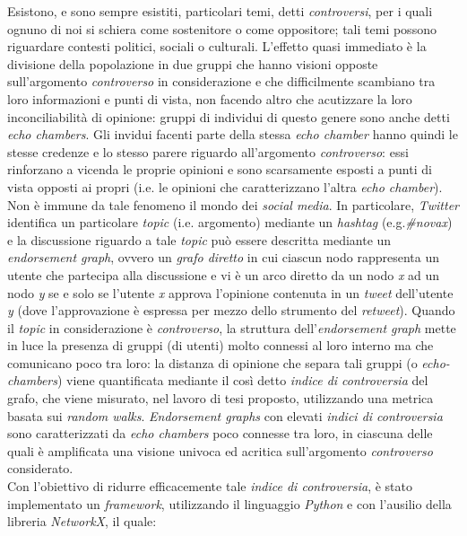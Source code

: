 \documentclass[trieste,12pt]{toptesi}
\begin{document}
\sommario
Esistono, e sono sempre esistiti, particolari temi, detti \textit{controversi}, per i quali ognuno di noi si schiera come sostenitore o come oppositore; tali temi possono riguardare contesti politici, sociali o culturali. L'effetto quasi immediato è la divisione della popolazione in due gruppi che hanno visioni opposte sull'argomento \textit{controverso} in considerazione e che difficilmente scambiano tra loro informazioni e punti di vista, non facendo altro che acutizzare la loro inconciliabilità di opinione: gruppi di individui di questo genere sono anche detti \textit{echo chambers}. Gli invidui facenti parte della stessa \textit{echo chamber} hanno quindi le stesse credenze e lo stesso parere riguardo all'argomento \textit{controverso}: essi rinforzano a vicenda le proprie opinioni e sono scarsamente esposti a punti di vista opposti ai propri (i.e. le opinioni che caratterizzano l'altra \textit{echo chamber}). Non è immune da tale fenomeno il mondo dei \textit{social media}. In particolare, \textit{Twitter} identifica un particolare \textit{topic} (i.e. argomento) mediante un \textit{hashtag} (e.g.\textit{\#novax}) e la discussione riguardo a tale \textit{topic} può essere descritta mediante un \textit{endorsement graph}, ovvero un \textit{grafo diretto} in cui ciascun nodo rappresenta un utente che partecipa alla discussione e vi è un arco diretto da un nodo \textit{x} ad un nodo \textit{y} se e solo se l'utente \textit{x} approva l'opinione contenuta in un \textit{tweet} dell'utente \textit{y} (dove l'approvazione è espressa per mezzo dello strumento del \textit{retweet}). Quando il \textit{topic} in considerazione è \textit{controverso}, la struttura dell'\textit{endorsement graph} mette in luce la presenza di gruppi (di utenti) molto connessi al loro interno ma che comunicano poco tra loro: la distanza di opinione che separa tali gruppi (o \textit{echo-chambers}) viene quantificata mediante il così detto \textit{indice di controversia} del grafo, che viene misurato, nel lavoro di tesi proposto, utilizzando una metrica basata sui \textit{random walks}. \textit{Endorsement graphs} con elevati \textit{indici di controversia} sono caratterizzati da \textit{echo chambers} poco connesse tra loro, in ciascuna delle quali è amplificata una visione univoca ed acritica sull'argomento \textit{controverso} considerato.\\Con l'obiettivo di ridurre efficacemente tale \textit{indice di controversia}, è stato implementato un \textit{framework}, utilizzando il linguaggio \textit{Python} e con l'ausilio della libreria \textit{NetworkX}, il quale:
\end{document}

